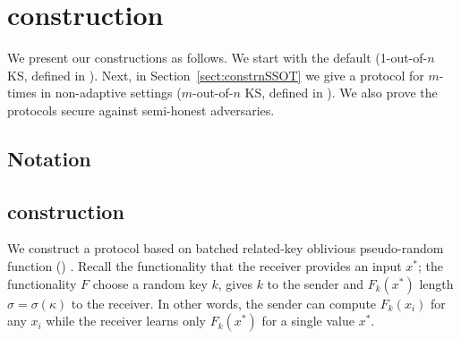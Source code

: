 
\section{\SSOT construction}

We present our constructions as follows.  We start with the default \SSOT  (1-out-of-$n$ KS, defined in ).  Next, in Section~\ref{sect:constrnSSOT} we give a protocol for $m$-times  \SSOT  in non-adaptive settings ($m$-out-of-$n$ KS, defined in ). We also prove the protocols secure against semi-honest adversaries.
 

\subsection{Notation}
\subsection{\SSOT construction}
\label{sect:constr1SSOT}

We construct a \SSOT protocol based on batched related-key oblivious pseudo-random function (\batchOPRF) \cite{CCS:KKRT16}. Recall the  \batchOPRF functionality that the receiver provides an input $x^*$; the functionality $F$ choose a random key $k$, gives $k$ to the sender and $F_k(x^*)$ length $\sigma=\sigma(\kappa)$ to the receiver. In other words, the sender can compute $F_k(x_i)$ for any $x_i$ while the receiver learns only $F_k(x^*)$ for a single value $x^*$. 

